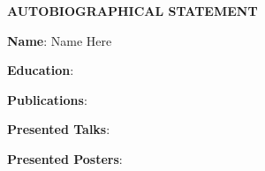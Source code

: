 \begin{center}
\textbf{AUTOBIOGRAPHICAL STATEMENT}
\end{center}
\noindent
\textbf{Name}:
\noindent
Name Here
\singlespacing

\noindent
\textbf{Education}:

\noindent

\noindent

\noindent

\noindent

\noindent
\vphantom{a}

\noindent
\textbf{Publications}: 

\noindent

\vphantom{a}

\doublespacing


\noindent
\textbf{Presented Talks}:

\noindent
\textbf{Presented Posters}:
